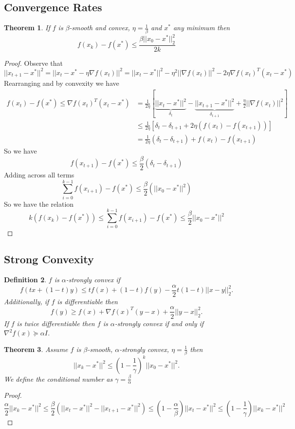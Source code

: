 \documentclass[a4paper]{article}
\newtheorem{thm}{Theorem}[section]
\newtheorem{defn}[thm]{Definition}
\begin{document}
\subsection{Convergence Rates}
\begin{thm}
    If $f$ is $\beta$-smooth and convex, $\eta= \frac{1}{\beta}$ and $x^*$ any minimum then \[
    f(x_k)-f(x^*)\leq \frac{\beta||x_0-x^*||_2^2}{2k}
    \]
\end{thm}
\begin{proof}
    Observe that \[
    ||x_{t+1}-x^*||^2=||x_t-x^*-\eta \nabla f(x_t)||^2=||x_t-x^*||^2-\eta^2||\nabla f(x_t)||^2-2\eta \nabla f(x_t)^T(x_t-x^*)
    \] 
    Rearranging and by convexity we have 
    \begin{align*}
        f(x_t)-f(x^*)\leq\nabla f(x_t)^T(x_t-x^*)&=\frac{1}{2\eta}\left [ \underbrace{||x_{t}-x^*||^2}_{\delta_{t}}-\underbrace{||x_{t+1}-x^*||^2}_{\delta_{t+1}} +\frac{\eta}{2}||\nabla f(x_t)||^2\right ]\\
        &\leq \frac{1}{2\eta} \left [\delta_t-\delta_{t+1}+2\eta (f(x_t)-f(x_{t+1})) \right ]\\
        &=\frac{1}{2\eta}(\delta_t-\delta_{t+1})+f(x_t)-f(x_{t+1})
    \end{align*}
    So we have \[
    f(x_{t+1})-f(x^*)\leq \frac{\beta}{2}(\delta_t-\delta_{t+1})
    \] 
    Adding across all terms \[
    \sum_{i=0}^{k-1} f(x_{i+1})-f(x^*)\leq \frac{\beta}{2} \left( ||x_0-x^*||^2 \right)
    \]
    So we have the relation \[
    k(f(x_k)-f(x^*))\leq  \sum_{i=0}^{k-1} f(x_{i+1})-f(x^*) \leq  \frac{\beta}{2} ||x_0-x^*||^2
    \]  
\end{proof}

\subsection{Strong Convexity}
\begin{defn}
    $f$ is $\alpha$-strongly convex if \[
    f(tx+(1-t)y)\leq tf(x)+(1-t)f(y)-\frac{\alpha}{2} t(1-t)||x-y||_2^2
    .\] 
    Additionally, if $f$ is differentiable then \[
    f(y)\geq f(x)+\nabla f(x)^T(y-x)+\frac{\alpha}{2}||y-x||_2^2
    .\] 
    If $f$ is twice differentiable then $f$ is $\alpha$-strongly convex if and only if $\nabla^2 f(x) \succeq \alpha I$.
\end{defn}
\begin{thm}
    Assume $f$ is $\beta$-smooth, $\alpha$-strongly convex, $\eta=\frac{1}{\beta}$ then \[
        ||x_k-x^*||^2\leq \left( 1-\frac{1}{\gamma} \right)^k||x_0-x^*||^2
    .\]
    We define the conditional number as $\gamma=\frac{\beta}{\alpha}$
\end{thm}
\begin{proof}
    \[
    \frac{\alpha}{2}||x_k-x^*||^2\leq \frac{\beta}{2} \left(  ||x_t-x^*||^2-||x_{t+1}-x^*||^2 \right)\leq \left( 1-\frac{\alpha}{\beta} \right)||x_t-x^*||^2 \leq (1-\frac{1}{\gamma})||x_k-x^*||^2
    \]
\end{proof}
\newpage
\end{document}
